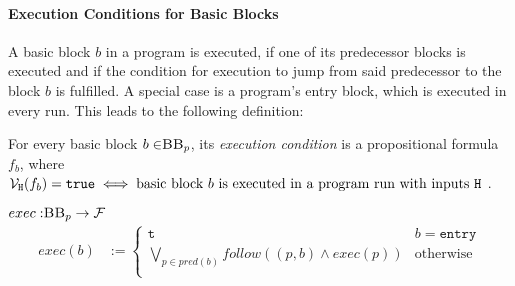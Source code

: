 \paragraph{Execution Conditions for Basic Blocks}
A basic block $b$ in a program is executed, if one of its predecessor blocks is executed and if the condition for execution to jump from said predecessor to the block $b$ is fulfilled. A special case is a program's entry block, which is executed in every run. This leads to the following definition: 

\begin{definition}\label{def:exec}
    For every basic block $b \in \mbb_p$, its \emph{execution condition} is a propositional formula $f_b$, where $\mathcal{V}_{\mathtt{H}}(f_b) = \mathtt{true} \iff \text{basic block $b$ is executed in a program run with inputs \texttt{H} }$. 
    \begin{center}
        $exec: \mbb_p \to \mbform$\\
        \begin{align*}
            exec(b) &:= \begin{cases}
                \mttt &  b = \mathtt{entry}\\
                \bigvee\limits_{p \in pred(b)} follow((p, b) \land exec(p)) & \text{otherwise}\\
        \end{cases}\\
        \end{align*}
    \end{center}
\end{definition}

